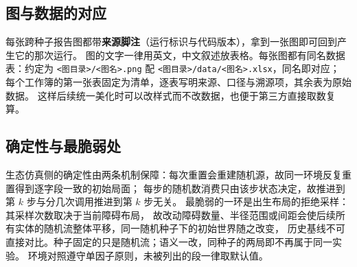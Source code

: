 \subsection{图与数据的对应}

每张跨种子报告图都带\textbf{来源脚注}（运行标识与代码版本），拿到一张图即可回到产生它的那次运行。
图的文字一律用英文，中文叙述放表格。每张图都有同名数据表：约定为
\texttt{<图目录>/<图名>.png} 配 \texttt{<图目录>/data/<图名>.xlsx}，同名即对应；
每个工作簿的第一张表固定为清单，逐表写明来源、口径与溯源项，其余表为原始数据。
这样后续统一美化时可以改样式而不改数据，也便于第三方直接取数复算。

\subsection{确定性与最脆弱处}

生态仿真侧的确定性由两条机制保障：每次重置会重建随机源，故同一环境反复重置得到逐字段一致的初始局面；
每步的随机数消费只由该步状态决定，故推进到第 $k$ 步与分几次调用推进到第 $k$ 步无关。
最脆弱的一环是出生布局的拒绝采样：其采样次数取决于当前障碍布局，
故改动障碍数量、半径范围或间距会使后续所有实体的随机流整体平移，同一随机种子下的初始世界随之改变，
历史基线不可直接对比。种子固定的只是随机流；语义一改，同种子的两局即不再属于同一实验。
环境对照遵守单因子原则，未被列出的段一律取默认值。
